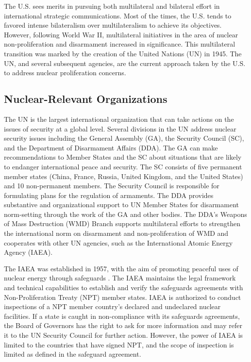 \documentclass{report}
\begin{document}
The U.S. sees merits in pursuing both multilateral and bilateral effort in international strategic communications. Most of the times, the U.S. tends to favored intense bilateralism over multilateralism to achieve its objectives. However, following World War II, multilateral initiatives in the area of nuclear non-proliferation and disarmament increased in significance.  This multilateral transition was marked by the creation of the United Nations (UN) in 1945.  The UN, and several subsequent agencies, are the current approach taken by the U.S. to address nuclear proliferation concerns.  

\subsection{Nuclear-Relevant Organizations }

The UN is the largest international organization that can take actions on the issues of security at a global level. Several divisions in the UN address nuclear security issues including the General Assembly (GA), the Security Council (SC), and the Department of Disarmament Affairs (DDA). The GA can make recommendations to Member States and the SC about situations that are likely to endanger international peace and security. The SC consists of five permanent member states (China, France, Russia, United Kingdom, and the United States) and 10 non-permanent members. The Security Council is responsible for formulating plans for the regulation of armaments. The DDA provides substantive and organizational support to UN Member States for disarmament norm-setting through the work of the GA and other bodies. The DDA's Weapons of Mass Destruction (WMD) Branch supports multilateral efforts to strengthen the international norm on disarmament and non-proliferation of WMD and cooperates with other UN agencies, such as the International Atomic Energy Agency (IAEA).

The IAEA was established in 1957, with the aim of promoting peaceful uses of nuclear energy through safeguards \cite{InternationalAtomicEnergyAgency}. The IAEA maintains the legal framework and technical capabilities to establish and verify the safeguards agreements with Non-Proliferation Treaty (NPT) member states. IAEA is authorized to conduct inspections of a NPT member country's declared and undeclared nuclear facilities. If a state is caught in non-compliance with its safeguards agreements, the Board of Governors has the right to ask for more information and may refer it to the UN Security Council for further action. However, the power of IAEA is limited to the countries that have signed NPT, and the scope of inspection is limited as defined in the safeguard agreement. 



\newpage
\pagestyle{fancyTOC}




\thispagestyle{fancyTOC}
\end{document}
